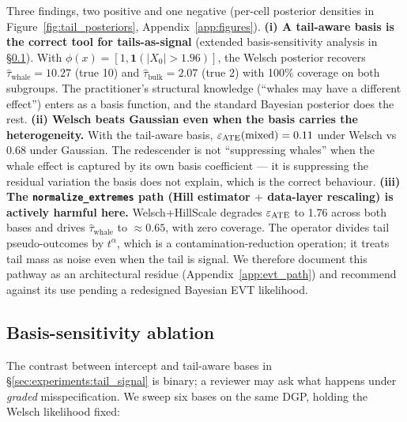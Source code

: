 Three findings, two positive and one negative
(per-cell posterior densities in
Figure~\ref{fig:tail_posteriors}, Appendix~\ref{app:figures}).
\textbf{(i) A
tail-aware basis is the correct tool for tails-as-signal}
(extended basis-sensitivity analysis in
\S\ref{sec:experiments:basis_ablation}). With
$\phi(x) = [1, \mathbf{1}(|X_0| > 1.96)]$, the Welsch posterior
recovers $\hat\tau_{\text{whale}} = 10.27$ (true 10) and
$\hat\tau_{\text{bulk}} = 2.07$ (true 2) with 100\% coverage on both
subgroups. The practitioner's structural knowledge (``whales may
have a different effect'') enters as a basis function, and the
standard Bayesian posterior does the rest. \textbf{(ii) Welsch
beats Gaussian even when the basis carries the heterogeneity.}
With the tail-aware basis, $\varepsilon_{\mathrm{ATE}}(\text{mixed}) = 0.11$ under
Welsch vs $0.68$ under Gaussian. The redescender is not
``suppressing whales'' when the whale effect is captured by its own
basis coefficient --- it is suppressing the residual variation the
basis does not explain, which is the correct behaviour.
\textbf{(iii) The \texttt{normalize\_extremes} path (Hill estimator
$+$ data-layer rescaling) is actively harmful here.} Welsch+HillScale
degrades $\varepsilon_{\mathrm{ATE}}$ to 1.76 across both bases and drives
$\hat\tau_{\text{whale}}$ to $\approx 0.65$, with zero coverage.
The operator divides tail pseudo-outcomes by $t^\alpha$, which is a
contamination-reduction operation; it treats tail mass as noise
even when the tail is signal. We therefore document this pathway as
an architectural residue (Appendix~\ref{app:evt_path}) and
recommend against its use pending a redesigned Bayesian EVT
likelihood.

\subsection{Basis-sensitivity ablation}
\label{sec:experiments:basis_ablation}
The contrast between intercept and tail-aware bases in
\S\ref{sec:experiments:tail_signal} is binary; a reviewer may
ask what happens under \emph{graded} misspecification. We sweep six
bases on the same DGP, holding the Welsch likelihood fixed:

